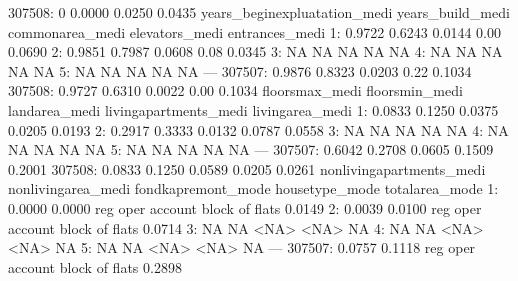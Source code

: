 \documentclass[a4paper]{article}
\begin{document}
\begin{Schunk}
\begin{Soutput}
307508:                        0             0.0000          0.0250            0.0435
        years_beginexpluatation_medi years_build_medi commonarea_medi elevators_medi entrances_medi
     1:                       0.9722           0.6243          0.0144           0.00         0.0690
     2:                       0.9851           0.7987          0.0608           0.08         0.0345
     3:                           NA               NA              NA             NA             NA
     4:                           NA               NA              NA             NA             NA
     5:                           NA               NA              NA             NA             NA
    ---                                                                                            
307507:                       0.9876           0.8323          0.0203           0.22         0.1034
307508:                       0.9727           0.6310          0.0022           0.00         0.1034
        floorsmax_medi floorsmin_medi landarea_medi livingapartments_medi livingarea_medi
     1:         0.0833         0.1250        0.0375                0.0205          0.0193
     2:         0.2917         0.3333        0.0132                0.0787          0.0558
     3:             NA             NA            NA                    NA              NA
     4:             NA             NA            NA                    NA              NA
     5:             NA             NA            NA                    NA              NA
    ---                                                                                  
307507:         0.6042         0.2708        0.0605                0.1509          0.2001
307508:         0.0833         0.1250        0.0589                0.0205          0.0261
        nonlivingapartments_medi nonlivingarea_medi fondkapremont_mode housetype_mode totalarea_mode
     1:                   0.0000             0.0000   reg oper account block of flats         0.0149
     2:                   0.0039             0.0100   reg oper account block of flats         0.0714
     3:                       NA                 NA               <NA>           <NA>             NA
     4:                       NA                 NA               <NA>           <NA>             NA
     5:                       NA                 NA               <NA>           <NA>             NA
    ---                                                                                             
307507:                   0.0757             0.1118   reg oper account block of flats         0.2898

\end{Soutput}
\end{Schunk}
\end{document}

